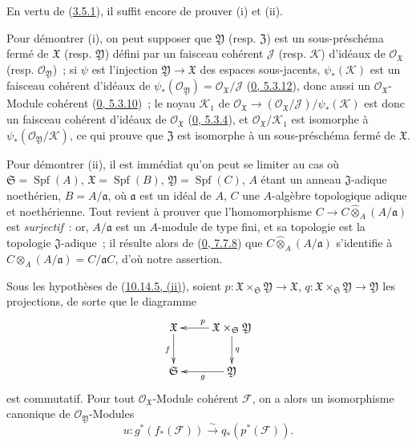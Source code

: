 En vertu de (\hyperref[I.3.5.1-fr]{3.5.1}), il suffit encore de prouver (i)
et (ii).

Pour démontrer (i), on peut supposer que $\mathfrak{Y}$ (resp.
$\mathfrak{Z}$) est un sous-préschéma fermé de $\mathfrak{X}$ (resp.
$\mathfrak{Y}$) défini par un faisceau cohérent $\mathscr{J}$ (resp.
$\mathscr{K}$) d'idéaux de $\mathscr{O}_{\mathfrak{X}}$ (resp.
$\mathscr{O}_{\mathfrak{Y}}$)~; si $\psi$ est l'injection
$\mathfrak{Y}\to\mathfrak{X}$ des espaces sous-jacents,
$\psi_*(\mathscr{K})$ est un faisceau cohérent d'idéaux de
$\psi_*(\mathscr{O}_{\mathfrak{Y}})
=\mathscr{O}_{\mathfrak{X}}/\mathscr{J}$
(\hyperref[0.5.3.12-fr]{0, 5.3.12}), donc aussi un
$\mathscr{O}_{\mathfrak{X}}$-Module cohérent
(\hyperref[0.5.3.10-fr]{0, 5.3.10})~; le noyau $\mathscr{K}_1$ de
$\mathscr{O}_{\mathfrak{X}}\to
(\mathscr{O}_{\mathfrak{X}}/\mathscr{J})/\psi_*(\mathscr{K})$ est donc un
faisceau cohérent d'idéaux de $\mathscr{O}_{\mathfrak{X}}$
(\hyperref[0.5.3.4-fr]{0, 5.3.4}), et
$\mathscr{O}_{\mathfrak{X}}/\mathscr{K}_1$ est isomorphe à
$\psi_*(\mathscr{O}_{\mathfrak{Y}}/\mathscr{K})$, ce qui prouve que
$\mathfrak{Z}$ est isomorphe à un sous-préschéma fermé de $\mathfrak{X}$.

Pour démontrer (ii), il est immédiat qu'on peut se limiter au cas où
$\mathfrak{S}=\operatorname{Spf}(A)$,
$\mathfrak{X}=\operatorname{Spf}(B)$,
$\mathfrak{Y}=\operatorname{Spf}(C)$, $A$ étant un anneau
$\mathfrak{J}$-adique noethérien, $B=A/\mathfrak{a}$, où $\mathfrak{a}$ est
un idéal de $A$, $C$ une $A$-algèbre topologique adique et noethérienne. Tout
revient à prouver que l'homomorphisme
$C\to C\widehat{\otimes}_A(A/\mathfrak{a})$ est \emph{surjectif}~: or,
$A/\mathfrak{a}$ est un $A$-module de type fini, et sa topologie est la
topologie $\mathfrak{J}$-adique~; il résulte alors de
(\hyperref[0.7.7.8-fr]{0, 7.7.8}) que
$C\widehat{\otimes}_A(A/\mathfrak{a})$ s'identifie à
$C\otimes_A(A/\mathfrak{a})=C/\mathfrak{a}C$, d'où notre assertion.

\begin{corollary}[10.14.6]
\label{I.10.14.6-fr}
Sous les hypothèses de (\hyperref[I.10.14.5-fr]{10.14.5, (ii)}), soient
$p:\mathfrak{X}\times_{\mathfrak{S}}\mathfrak{Y}\to\mathfrak{X}$,
$q:\mathfrak{X}\times_{\mathfrak{S}}\mathfrak{Y}\to\mathfrak{Y}$ les
projections, de sorte que le diagramme
\[
  \xymatrix{
    \mathfrak{X} \ar[d]_{f}
    & \mathfrak{X}\times_{\mathfrak{S}}\mathfrak{Y}
      \ar[l]_{p} \ar[d]^{q}\\
    \mathfrak{S}
    & \mathfrak{Y} \ar[l]^{g}
  }
\]
est commutatif. Pour tout $\mathscr{O}_{\mathfrak{X}}$-Module cohérent
$\mathscr{F}$, on a alors un isomorphisme canonique de
$\mathscr{O}_{\mathfrak{Y}}$-Modules
\[
  \label{I.10.14.6.1-fr}
  u:g^*(f_*(\mathscr{F}))
  \xrightarrow{\sim}
  q_*(p^*(\mathscr{F})).
  \tag{10.14.6.1}
\]
\end{corollary}

